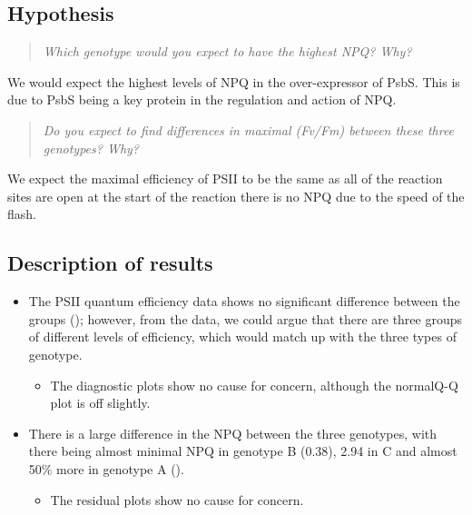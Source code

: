 \documentclass[
]{article}
\begin{document}
\subsection{Hypothesis}\label{hypothesis-1}

\begin{quote}
\emph{Which genotype would you expect to have the highest NPQ? Why?}
\end{quote}

We would expect the highest levels of NPQ in the over-expressor of PsbS.
This is due to PsbS being a key protein in the regulation and action of
NPQ.

\begin{quote}
\emph{Do you expect to find differences in maximal {} (Fv/Fm) between
these three genotypes? Why?}
\end{quote}

We expect the maximal efficiency of PSII to be the same as all of the
reaction sites are open at the start of the reaction there is no NPQ due
to the speed of the flash.

\subsection{Description of results}\label{description-of-results-2}

\begin{itemize}
\tightlist
\item
  The PSII quantum efficiency data shows no significant difference
  between the groups ({}); however, from the data, we could argue that
  there are three groups of different levels of efficiency, which would
  match up with the three types of genotype.

  \begin{itemize}
  \tightlist
  \item
    The diagnostic plots show no cause for concern, although the
    normalQ-Q plot is off slightly.
  \end{itemize}
\item
  There is a large difference in the NPQ between the three genotypes,
  with there being almost minimal NPQ in genotype B (0.38), 2.94 in C
  and almost 50\% more in genotype A ({}).

  \begin{itemize}
  \tightlist
  \item
    The residual plots show no cause for concern.
  \end{itemize}
\end{itemize}
\end{document}
